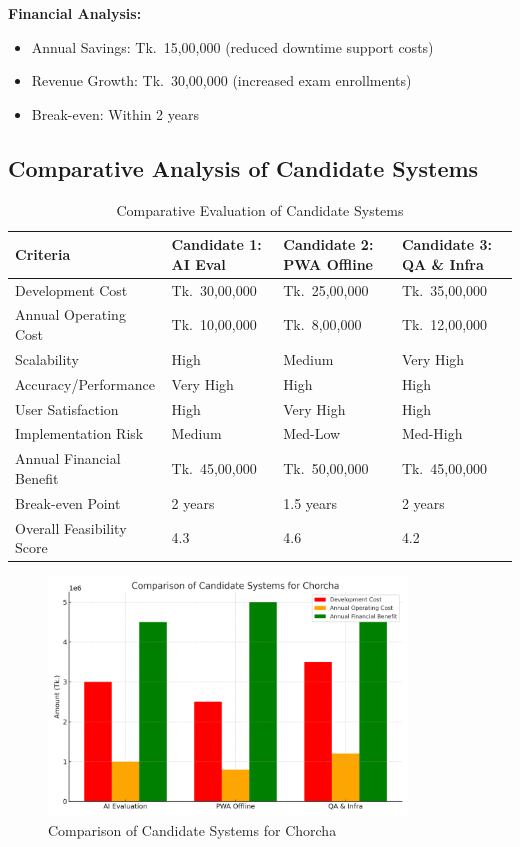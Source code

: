\documentclass[12pt,a4paper,oneside]{book}
\begin{document}
\textbf{Financial Analysis:}
\begin{itemize}
    \item Annual Savings: Tk.~15,00,000 (reduced downtime support costs)
    \item Revenue Growth: Tk.~30,00,000 (increased exam enrollments)
    \item Break-even: Within 2 years
\end{itemize}

\subsection{Comparative Analysis of Candidate Systems}

\begin{table}[H]
\centering
\caption{Comparative Evaluation of Candidate Systems}
\footnotesize %
\begin{tabular}{|L{3.2cm}|C{2.2cm}|C{2.2cm}|C{2.2cm}|}
\hline
\textbf{Criteria} & \textbf{Candidate 1: AI Eval} & \textbf{Candidate 2: PWA Offline} & \textbf{Candidate 3: QA \& Infra} \\
\hline
Development Cost & Tk.~30,00,000 & Tk.~25,00,000 & Tk.~35,00,000 \\
\hline
Annual Operating Cost & Tk.~10,00,000 & Tk.~8,00,000 & Tk.~12,00,000 \\
\hline
Scalability & High & Medium & Very High \\
\hline
Accuracy/Performance & Very High & High & High \\
\hline
User Satisfaction & High & Very High & High \\
\hline
Implementation Risk & Medium & Med-Low & Med-High \\
\hline
Annual Financial Benefit & Tk.~45,00,000 & Tk.~50,00,000 & Tk.~45,00,000 \\
\hline
Break-even Point & 2 years & 1.5 years & 2 years \\
\hline
Overall Feasibility Score & 4.3 & 4.6 & 4.2 \\
\hline
\end{tabular}
\end{table}

\begin{figure}[H]
    \centering
    \includegraphics[width=0.85\textwidth]{candidate_systems_comparison.png}
    \caption{Comparison of Candidate Systems for Chorcha}
    \end{figure}
\end{document}
